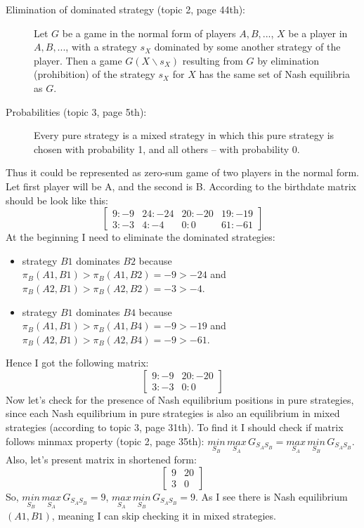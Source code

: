 \documentclass[
	a4paper, %
	11pt, %
]{CSUniSchoolLabReport}
\begin{document}
\begin{description}
    \item[Elimination of dominated strategy (topic 2, page 44th):] Let $G$ be a game in the normal form of players $A, B, ...$, $X$ be a player in $A, B, ...$, with a strategy $s_X$ dominated by some another strategy of the player. Then a game $G(X\backslash s_X)$ resulting from $G$ by elimination (prohibition) of the strategy $s_X$ for $X$ has the same set of Nash equilibria as $G$.
    \item[Probabilities (topic 3, page 5th):] Every pure strategy is a mixed strategy in which this pure strategy is chosen with probability 1, and all others – with probability 0.
\end{description}\hspace{2pt}

Thus it could be represented as zero-sum game of two players in the normal form. Let first player will be A, and the second is B.
According to the birthdate matrix should be look like this:
$$
\begin{bmatrix}
    9:-9 & 24:-24 & 20:-20 & 19:-19 \\
    3:-3 & 4:-4 & 0:0 & 61:-61
\end{bmatrix}
$$
At the beginning I need to eliminate the dominated strategies:\\
\begin{itemize}
    \item strategy $B1$ dominates $B2$ because $\pi_B(A1, B1) > \pi_B(A1, B2) = -9 > -24$ and $\pi_B(A2, B1) > \pi_B(A2, B2) = -3 > -4$.
    \item strategy $B1$ dominates $B4$ because $\pi_B(A1, B1) > \pi_B(A1, B4) = -9 > -19$ and $\pi_B(A2, B1) > \pi_B(A2, B4) = -9 > -61$.
\end{itemize}\hspace{2pt}

Hence I got the following matrix:
$$
\begin{bmatrix}
    9:-9 & 20:-20 \\
    3:-3 & 0:0
\end{bmatrix}
$$
Now let's check for the presence of Nash equilibrium positions in pure strategies, since each Nash equilibrium in pure strategies is also an equilibrium in mixed strategies (according to topic 3, page 31th). To find it I should check if matrix follows minmax property (topic 2, page 35th): $\underset{S_B}{min}\, \underset{S_A}{max}\, G_{S_AS_B} = \underset{S_A}{max}\, \underset{S_B}{min}\, G_{S_AS_B}$. Also, let's present matrix in shortened form: 
$$
\begin{bmatrix}
    9 & 20 \\
    3 & 0
\end{bmatrix}
$$
So, $\underset{S_B}{min}\, \underset{S_A}{max}\, G_{S_AS_B} = 9$, $\underset{S_A}{max}\, \underset{S_B}{min}\, G_{S_AS_B} = 9$. As I see there is Nash equilibrium $(A1,B1)$, meaning I can skip checking it in mixed strategies.
\end{document}
